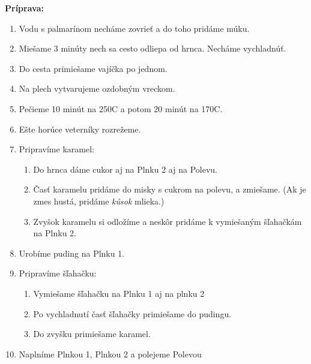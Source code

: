 \begin{recipe}
\textbf{ {\normalsize Príprava:} }
\begin{enumerate}

  \item{Vodu s palmarínom necháme zovrieť a do toho pridáme múku.}
  \item{Miešame 3 minúty nech sa cesto odliepa od hrnca. Necháme vychladnúť.}
  \item{Do cesta primiešame vajíčka po jednom.}
  \item{Na plech vytvarujeme ozdobným vreckom.}
  \item{Pečieme 10 minút na 250C a potom 20 minút na 170C.}
  \item{Ešte horúce veterníky rozrežeme.}
  \item{Pripravíme karamel: }
      \begin{enumerate}
          \item{Do hrnca dáme cukor aj na Plnku 2 aj na Polevu.}
          \item{Časť karamelu pridáme do misky s cukrom na polevu, a zmiešame. (Ak je zmes hustá, pridáme \emph{kúsok} mlieka.)}
          \item{Zvyšok karamelu si odložíme a neskôr pridáme k vymiešaným šľahačkám na Plnku 2.}\end{enumerate}
  \item{Urobíme puding na Plnku 1.}
  \item{Pripravíme šľahačku: }
      \begin{enumerate}
          \item{Vymiešame šľahačku na Plnku 1 aj na plnku 2}
          \item{Po vychladnutí časť šľahačky primiešame do pudingu.}
          \item{Do zvyšku primiešame karamel.}\end{enumerate}
  \item{Naplníme Plnkou 1, Plnkou 2 a polejeme Polevou}

\end{enumerate}
\end{recipe}

\begin{notes}
  
\end{notes}	
\clearpage
